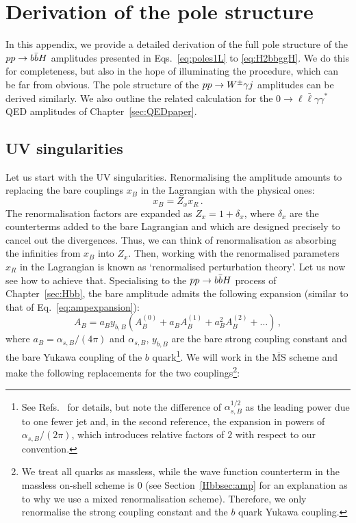 \documentclass[main.tex]{subfiles}
\begin{document}
\chapter{Derivation of the pole structure} \label{app:polestructure}
In this appendix, we provide a detailed derivation of the full pole structure of the $pp \rightarrow b\bar{b}H$ amplitudes presented in Eqs.~\ref{eq:poles1L} to \ref{eq:H2bbggH}. We do this for completeness, but also in the hope of illuminating the procedure, which can be far from obvious. The pole structure of the $pp \rightarrow W^\pm \gamma j$ amplitudes can be derived similarly. We also outline the related calculation for the $0\to \ell \bar\ell \gamma \gamma^*$ QED amplitudes of Chapter~\ref{sec:QEDpaper}.
\section{UV singularities}
Let us start with the UV singularities. Renormalising the amplitude amounts to replacing the bare couplings $x_B$ in the Lagrangian with the physical ones:
\begin{equation}
    x_B = Z_x x_R \,.
\end{equation}
The renormalisation factors are expanded as $Z_x = 1 + \delta_x$, where $\delta_x$ are the counterterms added to the bare Lagrangian and which are designed precisely to cancel out the divergences. Thus, we can think of renormalisation as absorbing the infinities from $x_B$ into $Z_x$. Then, working with the renormalised parameters $x_R$ in the Lagrangian is known as `renormalised perturbation theory'. Let us now see how to achieve that. Specialising to the $pp \rightarrow b\bar{b}H$ process of Chapter~\ref{sec:Hbb}, the bare amplitude admits the following expansion (similar to that of Eq.~\ref{eq:ampexpansion}):
\begin{equation} \label{eq:ampexpbare}
    A_B = a_B y_{b,B} \left(A_B^{(0)} + a_B A_B^{(1)} + a_B^2 A_B^{(2)} + \ldots \right)\,,
\end{equation}
where $a_B = \alpha_{s,B}/(4\pi)$ and $\alpha_{s,B}$, $y_{b,B}$ are the bare strong coupling constant and the bare Yukawa coupling of the $b$ quark\footnote{See Refs.~\cite{Ahmed:2014pka, Mondini:2019vub} for details, but note the difference of $\alpha_{s,B}^{1/2}$ as the leading power due to one fewer jet and, in the second reference, the expansion in powers of $\alpha_{s,B}/(2 \pi)$, which introduces relative factors of $2$ with respect to our convention.}. We will work in the $\overline{\text{MS}}$ scheme and make the following replacements for the two couplings\footnote{We treat all quarks as massless, while the wave function counterterm in the massless on-shell scheme is 0 (see Section~\ref{Hbbsec:amp} for an explanation as to why we use a mixed renormalisation scheme). Therefore, we only renormalise the strong coupling constant and the $b$ quark Yukawa coupling.}:
\end{document}
